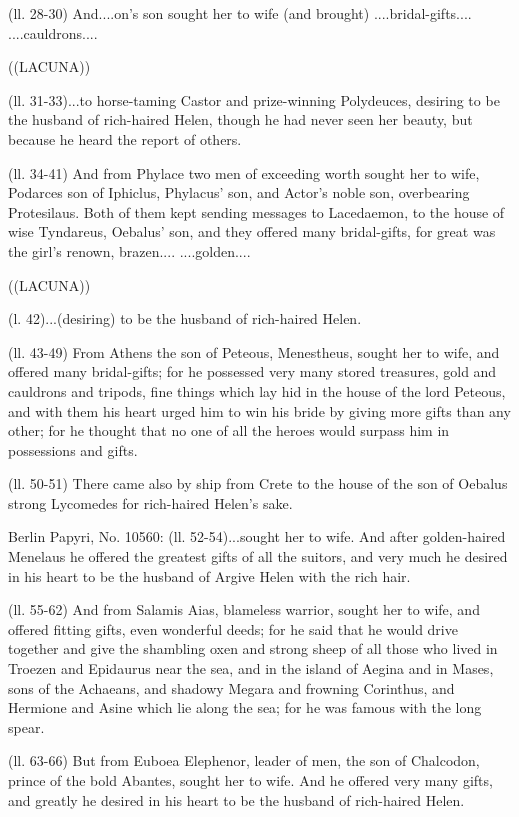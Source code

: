 (ll. 28-30) And....on’s son sought her to wife (and brought)
....bridal-gifts.... ....cauldrons....

((LACUNA))

(ll. 31-33)...to horse-taming Castor and prize-winning Polydeuces, desiring to
be the husband of rich-haired Helen, though he had never seen her beauty, but
because he heard the report of others.

(ll. 34-41) And from Phylace two men of exceeding worth sought her to wife,
Podarces son of Iphiclus, Phylacus’ son, and Actor’s noble son,
overbearing Protesilaus. Both of them kept sending messages to Lacedaemon, to
the house of wise Tyndareus, Oebalus’ son, and they offered many
bridal-gifts, for great was the girl’s renown, brazen.... ....golden....

((LACUNA))

(l. 42)...(desiring) to be the husband of rich-haired Helen.

(ll. 43-49) From Athens the son of Peteous, Menestheus, sought her to wife, and
offered many bridal-gifts; for he possessed very many stored treasures, gold
and cauldrons and tripods, fine things which lay hid in the house of the lord
Peteous, and with them his heart urged him to win his bride by giving more
gifts than any other; for he thought that no one of all the heroes would
surpass him in possessions and gifts.

(ll. 50-51) There came also by ship from Crete to the house of the son of
Oebalus strong Lycomedes for rich-haired Helen’s sake.

Berlin Papyri, No. 10560: (ll. 52-54)...sought her to wife. And after
golden-haired Menelaus he offered the greatest gifts of all the suitors, and
very much he desired in his heart to be the husband of Argive Helen with the
rich hair.

(ll. 55-62) And from Salamis Aias, blameless warrior, sought her to wife, and
offered fitting gifts, even wonderful deeds; for he said that he would drive
together and give the shambling oxen and strong sheep of all those who lived in
Troezen and Epidaurus near the sea, and in the island of Aegina and in Mases,
sons of the Achaeans, and shadowy Megara and frowning Corinthus, and Hermione
and Asine which lie along the sea; for he was famous with the long spear.

(ll. 63-66) But from Euboea Elephenor, leader of men, the son of Chalcodon,
prince of the bold Abantes, sought her to wife. And he offered very many gifts,
and greatly he desired in his heart to be the husband of rich-haired Helen.

